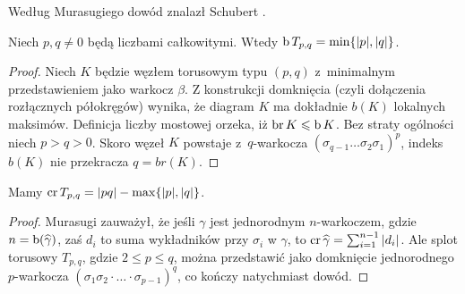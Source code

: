 Według Murasugiego \cite[s. 150]{murasugi1996} dowód znalazł Schubert \cite{schubert1954}.
%

\begin{corollary}
%
\label{cor:torus_braid_number}%
    Niech $p, q \neq 0$ będą liczbami całkowitymi.
    Wtedy $\operatorname{b} T_{p, q} = \min \{|p|, |q|\}$.
\end{corollary}

\begin{proof}
    Niech $K$ będzie węzłem torusowym typu $(p,q)$ z~minimalnym przedstawieniem jako warkocz $\beta$.
    Z konstrukcji domknięcia (czyli dołączenia rozłącznych półokręgów) wynika,
    że diagram $K$ ma dokładnie $b(K)$ lokalnych maksimów.
    Definicja liczby mostowej orzeka, iż $\operatorname{br} K \leqslant \operatorname{b} K$.
    Bez straty ogólności niech $p > q > 0$.
    Skoro węzeł $K$ powstaje z~$q$-warkocza $(\sigma_{q-1} \ldots \sigma_2\sigma_1)^p$,
    indeks $b(K)$ nie przekracza $q = br(K)$.
\end{proof}

\begin{proposition}
%
    Mamy $\operatorname{cr} T_{p, q} = |pq| - \max\{|p|, |q|\}$.
\end{proposition}
    
\begin{proof}
%
    Murasugi \cite[s. 255]{murasugi1991} zauważył, że jeśli $\gamma$ jest jednorodnym $n$-warkoczem, gdzie $n = \operatorname{b}(\widehat{\gamma})$, zaś $d_i$ to suma wykładników przy $\sigma_i$ w $\gamma$, to $\operatorname{cr} \widehat{\gamma} = \sum_{i=1}^{n-1} |d_i|$.
    Ale splot torusowy $T_{p, q}$, gdzie $2 \le p \le q$, można przedstawić jako domknięcie jednorodnego $p$-warkocza $(\sigma_1 \sigma_2 \cdot \ldots \cdot \sigma_{p-1})^q$, co kończy natychmiast dowód.
\end{proof}

